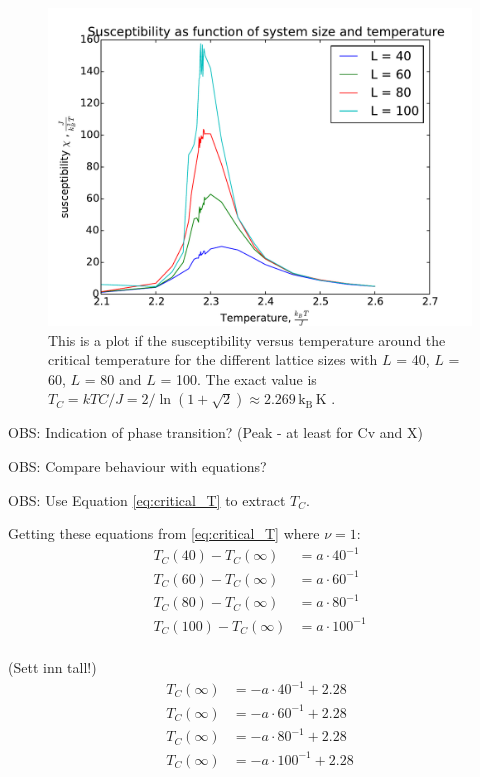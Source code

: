 \begin{figure}[H]
\includegraphics[width=\linewidth]{../results/4e/4e_x}\caption{This is a plot if the susceptibility versus temperature around the critical temperature for the different lattice sizes with $L$ = 40, $L$ = 60, $L$ = 80 and $L$ = 100. The exact value is $T_C =  kTC/J = 2/ \ln(1+\sqrt{
2}) \approx 2.269 \,\text{k}_\text{B} \,\text{K}$ \cite{Onsager}.}\label{fig:4e_suscept}
\end{figure}

OBS: Indication of phase transition? (Peak - at least for Cv and X)

OBS: Compare behaviour with equations?

OBS: Use Equation \ref{eq:critical_T} to extract $T_C$.

Getting these equations from \ref{eq:critical_T} where $\nu = 1$:
\begin{align*}
T_C(40) - T_C(\infty) &= a \cdot 40^{-1}\\
T_C(60) - T_C(\infty) &= a \cdot 60^{-1}\\
T_C(80) - T_C(\infty) &= a \cdot 80^{-1}\\
T_C(100) - T_C(\infty) &= a \cdot 100^{-1}\\
\end{align*}

(Sett inn tall!)
\begin{align}\label{eq:find_critial_T}
T_C(\infty) &= - a \cdot 40^{-1} + 2.28\\
T_C(\infty) &= - a \cdot 60^{-1} + 2.28\\
T_C(\infty) &= - a \cdot 80^{-1} + 2.28\\
T_C(\infty) &= - a \cdot 100^{-1} + 2.28\label{eq:find_critial_T_end}
\end{align}


